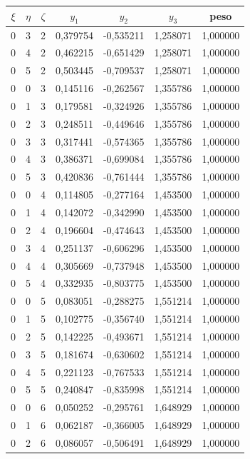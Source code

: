 \begin{apendicesenv}
\begin{table}[H]
	\centering
	\scriptsize
	\begin{tabular}{ccccccc}
		\toprule
		\centering $\xi$ & $\eta$ & $\zeta$ & $y_1$ & $y_2$ & $y_3$ & peso \\
		\midrule
			0 & 3 & 2 & 0,379754 & -0,535211 & 1,258071 & 1,000000 \\
		0 & 4 & 2 & 0,462215 & -0,651429 & 1,258071 & 1,000000 \\
		0 & 5 & 2 & 0,503445 & -0,709537 & 1,258071 & 1,000000 \\
		0 & 0 & 3 & 0,145116 & -0,262567 & 1,355786 & 1,000000 \\
		0 & 1 & 3 & 0,179581 & -0,324926 & 1,355786 & 1,000000 \\
		0 & 2 & 3 & 0,248511 & -0,449646 & 1,355786 & 1,000000 \\
		0 & 3 & 3 & 0,317441 & -0,574365 & 1,355786 & 1,000000 \\
		0 & 4 & 3 & 0,386371 & -0,699084 & 1,355786 & 1,000000 \\
		0 & 5 & 3 & 0,420836 & -0,761444 & 1,355786 & 1,000000 \\
		0 & 0 & 4 & 0,114805 & -0,277164 & 1,453500 & 1,000000 \\
		0 & 1 & 4 & 0,142072 & -0,342990 & 1,453500 & 1,000000 \\
		0 & 2 & 4 & 0,196604 & -0,474643 & 1,453500 & 1,000000 \\
		0 & 3 & 4 & 0,251137 & -0,606296 & 1,453500 & 1,000000 \\
		0 & 4 & 4 & 0,305669 & -0,737948 & 1,453500 & 1,000000 \\
		0 & 5 & 4 & 0,332935 & -0,803775 & 1,453500 & 1,000000 \\
		0 & 0 & 5 & 0,083051 & -0,288275 & 1,551214 & 1,000000 \\
		0 & 1 & 5 & 0,102775 & -0,356740 & 1,551214 & 1,000000 \\
		0 & 2 & 5 & 0,142225 & -0,493671 & 1,551214 & 1,000000 \\
		0 & 3 & 5 & 0,181674 & -0,630602 & 1,551214 & 1,000000 \\
		0 & 4 & 5 & 0,221123 & -0,767533 & 1,551214 & 1,000000 \\
		0 & 5 & 5 & 0,240847 & -0,835998 & 1,551214 & 1,000000 \\
		0 & 0 & 6 & 0,050252 & -0,295761 & 1,648929 & 1,000000 \\
		0 & 1 & 6 & 0,062187 & -0,366005 & 1,648929 & 1,000000 \\
		0 & 2 & 6 & 0,086057 & -0,506491 & 1,648929 & 1,000000 \\

\end{tabular}
\end{table}
\end{apendicesenv}
